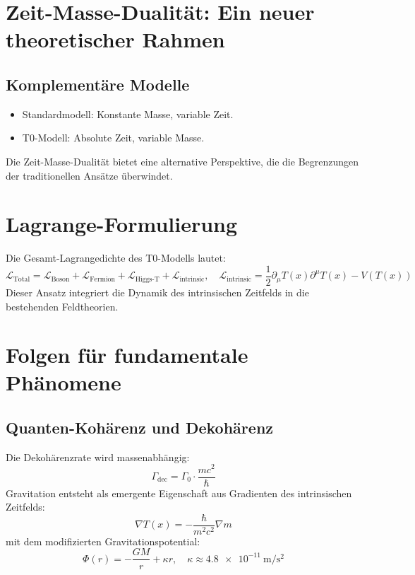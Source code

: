 \documentclass{article}
\newcommand{\Tfield}{T(x)}
\begin{document}
	\section{Zeit-Masse-Dualität: Ein neuer theoretischer Rahmen}
	\subsection{Komplementäre Modelle}
	\begin{itemize}
		\item Standardmodell: Konstante Masse, variable Zeit.
		\item T0-Modell: Absolute Zeit, variable Masse.
	\end{itemize}
	Die Zeit-Masse-Dualität bietet eine alternative Perspektive, die die Begrenzungen der traditionellen Ansätze überwindet.
	
	\section{Lagrange-Formulierung}
	Die Gesamt-Lagrangedichte des T0-Modells lautet:
	\begin{equation}
		\mathcal{L}_{\text{Total}} = \mathcal{L}_{\text{Boson}} + \mathcal{L}_{\text{Fermion}} + \mathcal{L}_{\text{Higgs-T}} + \mathcal{L}_{\text{intrinsic}}, \quad \mathcal{L}_{\text{intrinsic}} = \frac{1}{2} \partial_\mu \Tfield \partial^\mu \Tfield - V(\Tfield)
	\end{equation}
	Dieser Ansatz integriert die Dynamik des intrinsischen Zeitfelds in die bestehenden Feldtheorien.
	
	\section{Folgen für fundamentale Phänomene}
	\subsection{Quanten-Kohärenz und Dekohärenz}
	Die Dekohärenzrate wird massenabhängig:
	\begin{equation}
		\Gamma_{\text{dec}} = \Gamma_0 \cdot \frac{m c^2}{\hbar}
	\end{equation}
	Gravitation entsteht als emergente Eigenschaft aus Gradienten des intrinsischen Zeitfelds:
	\begin{equation}
		\nabla \Tfield = -\frac{\hbar}{m^2 c^2} \nabla m
	\end{equation}
	mit dem modifizierten Gravitationspotential:
	\begin{equation}
		\Phi(r) = -\frac{G M}{r} + \kappa r, \quad \kappa \approx \SI{4.8e-11}{\meter\per\second\squared}
	\end{equation}
	
\end{document}
